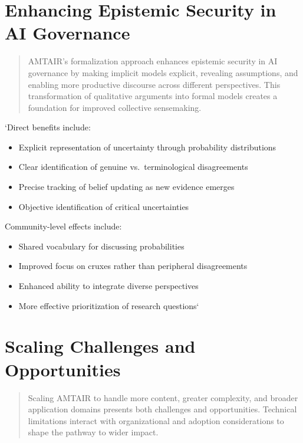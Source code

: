 \documentclass[12pt,a4paper]{report}
\providecommand{\tightlist}{%
  \setlength{\itemsep}{0pt}\setlength{\parskip}{0pt}}
\begin{document}
\section{Enhancing Epistemic Security in AI
Governance}\label{sec-epistemic-security}

\begin{quote}
AMTAIR's formalization approach enhances epistemic security in AI
governance by making implicit models explicit, revealing assumptions,
and enabling more productive discourse across different perspectives.
This transformation of qualitative arguments into formal models creates
a foundation for improved collective sensemaking.
\end{quote}

`Direct benefits include:

\begin{itemize}
\tightlist
\item
  Explicit representation of uncertainty through probability
  distributions
\item
  Clear identification of genuine vs.~terminological disagreements
\item
  Precise tracking of belief updating as new evidence emerges
\item
  Objective identification of critical uncertainties
\end{itemize}

Community-level effects include:

\begin{itemize}
\tightlist
\item
  Shared vocabulary for discussing probabilities
\item
  Improved focus on cruxes rather than peripheral disagreements
\item
  Enhanced ability to integrate diverse perspectives
\item
  More effective prioritization of research questions`
\end{itemize}

\section{Scaling Challenges and
Opportunities}\label{sec-scaling-challenges}

\begin{quote}
Scaling AMTAIR to handle more content, greater complexity, and broader
application domains presents both challenges and opportunities.
Technical limitations interact with organizational and adoption
considerations to shape the pathway to wider impact.
\end{quote}
\end{document}
